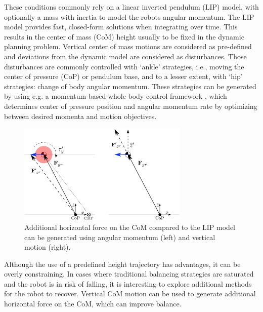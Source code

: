 \documentclass[letterpaper, 10 pt, conference]{ieeeconf}  %
\begin{document}
These conditions commonly rely on a linear inverted pendulum (LIP) model, with optionally a mass with inertia to model the robots angular momentum. The LIP model provides fast, closed-form solutions when integrating over time. This results in the center of mass (CoM) height usually to be fixed in the dynamic planning problem. Vertical center of mass motions are considered as pre-defined and deviations from the dynamic model are considered as disturbances. Those disturbances are commonly controlled with `ankle' strategies, i.e., moving the center of pressure (CoP) or pendulum base, and to a lesser extent, with `hip' strategies: change of body angular momentum. These strategies can be generated by using e.g. a momentum-based whole-body control framework \cite{kajita2003resolved, lee2012momentum,koolen2016design}, which determines center of pressure position and angular momentum rate by optimizing between desired momenta and motion objectives.

\begin{figure}[h]
      \centering
      \includegraphics[width=3.2in]{modelvarzvsang3.png} %
      \caption{Additional horizontal force on the CoM compared to the LIP model can be generated using angular momentum (left) and vertical motion (right). }
      \label{fig:angvsvarz}
\end{figure}

Although the use of a predefined height trajectory has advantages, it can be overly constraining. In cases where traditional balancing strategies are saturated and the robot is in risk of falling, it is interesting to explore additional methods for the robot to recover. Vertical CoM motion can be used to generate additional horizontal force on the CoM, which can improve balance.
\end{document}
